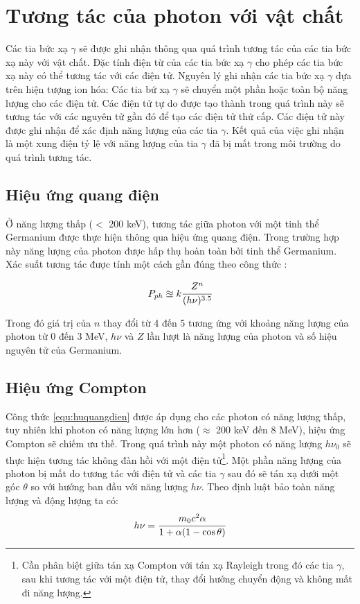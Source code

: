 \chapter{Tương tác của photon với vật chất}
\label{ch:cosolythuyet}

Các tia bức xạ $\gamma$ sẽ được ghi nhận thông qua quá trình tương tác của các tia bức xạ này với vật chất. Đặc tính điện từ của các tia bức xạ $\gamma$ cho phép các tia bức xạ này có thể tương tác với các điện tử. Nguyên lý ghi nhận các tia bức xạ $\gamma$ dựa trên hiện tượng ion hóa: Các tia bứ xạ $\gamma$ sẽ chuyển một phần hoặc toàn bộ năng lượng cho các điện tử. Các điện tử tự do được tạo thành trong quá trình này sẽ tương tác với các nguyên tử gần đó để tạo các điện tử thứ cấp. Các điện tử này được ghi nhận để xác định năng lượng của các tia $\gamma$. Kết quả của việc ghi nhận là một xung điện tỷ lệ với năng lượng của tia $\gamma$ đã bị mất trong môi trường do quá trình tương tác.

\section{Hiệu ứng quang điện}
Ở năng lượng thấp ($<$ 200 keV), tương tác giữa photon với một tinh thể Germanium được thực hiện thông qua hiệu ứng quang điện. Trong trường hợp này năng lượng của photon được hấp thụ hoàn toàn bởi tinh thể Germanium. Xác suất tương tác được tính một cách gần đúng theo công thức \cite{bib_Knoll}:

\begin{equation} 
P_{ph}\approxeq k\cfrac{Z^{n}}{(h\nu)^{3.5}}
\label{equ:huquangdien}
\end{equation}

Trong đó giá trị của $n$ thay đổi từ 4 đến 5 tương ứng với khoảng năng lượng của photon từ 0 đến 3 MeV, $h\nu$  và $Z$ lần lượt là năng lượng của photon và số hiệu nguyên tử của Germanium.

\section{Hiệu ứng Compton}

Công thức \ref{equ:huquangdien} được áp dụng cho các photon có năng lượng thấp, tuy nhiên khi photon có năng lượng lớn hơn ($\approx$ 200 keV đến 8 MeV), hiệu ứng Compton sẽ chiếm ưu thế. Trong quá trình này một photon có năng lượng $h\nu_{0}$ sẽ thực hiện tương tác không đàn hồi với một điện tử\footnote{Cần phân biệt giữa tán xạ Compton với tán xạ Rayleigh trong đó các tia $\gamma$, sau khi tương tác với một điện tử, thay đổi hướng chuyển động và không mất đi năng lượng.}. Một phần năng lượng của photon bị mất do tương tác với điện tử và các tia $\gamma$ sau đó sẽ tán xạ dưới một góc $\theta$  so với hướng ban đầu với năng lượng $h\nu$. Theo định luật bảo toàn năng lượng và động lượng ta có: 
%
\begin{equation}
h\nu=\cfrac{m_{0}c^{2}\alpha}{1+\alpha(1-\cos{\theta})}
\end{equation}

